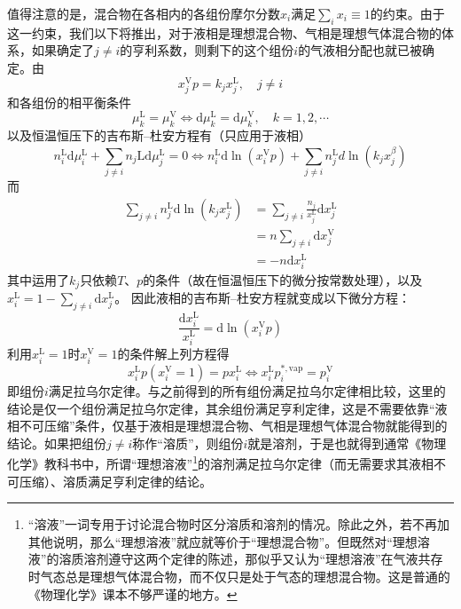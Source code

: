 \documentclass[main.tex]{subfiles}
\begin{document}
值得注意的是，混合物在各相内的各组份摩尔分数$x_i$满足$\sum_ix_i\equiv 1$的约束。由于这一约束，我们以下将推出，对于液相是理想混合物、气相是理想气体混合物的体系，如果确定了$j\neq i$的亨利系数，则剩下的这个组份$i$的气液相分配也就已被确定。由
\[x_j^\text{V}p=k_jx_j^\text{L},\quad j\neq i\]
和各组份的相平衡条件
\[\mu_k^\text{L}=\mu_k^\text{V}\Leftrightarrow \mathrm{d}\mu_k^\text{L}=\mathrm{d}\mu_k^\text{V},\quad k=1,2,\cdots\]
以及恒温恒压下的吉布斯--杜安方程有（只应用于液相）
\[
  n_i^\text{L}\mathrm{d}\mu_i^\text{L}+\sum_{j\neq i}n_j\text{L}\mathrm{d}\mu_j^\text{L}=0\Leftrightarrow n_i^\text{L}\mathrm{d}\ln\left(x_i^\text{V}p\right)+\sum_{j\neq i}n_j^\text{L}d\ln\left(k_jx_j^\beta\right)
\]
而
\begin{align*}
  \sum_{j\neq i}n_j^\text{L}\mathrm{d}\ln\left(k_j x_j^\text{L}\right) & =\sum_{j\neq i}\frac{n_j}{x_j^\text{L}}\mathrm{d}x_j^\text{L} \\
                                                                       & =n\sum_{j\neq i}\mathrm{d}x_j^\text{V}                        \\
                                                                       & =-n\mathrm{d}x_i^\text{L}
\end{align*}
其中运用了$k_j$只依赖$T$、$p$的条件（故在恒温恒压下的微分按常数处理），以及$x_i^\text{L}=1-\sum_{j\neq i}\mathrm{d}x_j^\text{L}$。
因此液相的吉布斯--杜安方程就变成以下微分方程：
\[\frac{\mathrm{d}x_i^\text{L}}{x_i^\text{L}}=\mathrm{d}\ln\left(x_i^\text{V}p\right)\]
利用$x_i^\text{L}=1$时$x_i^\text{V}=1$的条件解上列方程得
\[x_i^\text{L}p\left(x_i^\text{V}= 1\right)=p x_i^\text{L}\Leftrightarrow x_i^\text{L}p_i^{*,\text{vap}}=p^\text{V}_i\]
即组份$i$满足拉乌尔定律。与之前得到的所有组份满足拉乌尔定律相比较，这里的结论是仅一个组份满足拉乌尔定律，其余组份满足亨利定律，这是不需要依靠“液相不可压缩”条件，仅基于液相是理想混合物、气相是理想气体混合物就能得到的结论。如果把组份$j\neq i$称作“溶质”，则组份$i$就是溶剂，于是也就得到通常《物理化学》教科书中，所谓“理想溶液”\footnote{“溶液”一词专用于讨论混合物时区分溶质和溶剂的情况。除此之外，若不再加其他说明，那么“理想溶液”就应就等价于“理想混合物”。但既然对“理想溶液”的溶质溶剂遵守这两个定律的陈述，那似乎又认为“理想溶液”在气液共存时气态总是理想气体混合物，而不仅只是处于气态的理想混合物。这是普通的《物理化学》课本不够严谨的地方。}的溶剂满足拉乌尔定律（而无需要求其液相不可压缩）、溶质满足亨利定律的结论。
\end{document}
